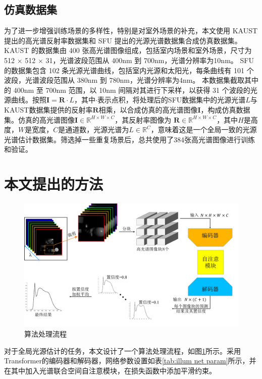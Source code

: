 \documentclass[
    type = master, %
    degree = academic,        %
    decl-page,  %
  ]{njuthesis}
\begin{document}
\subsection{仿真数据集}
为了进一步增强训练场景的多样性，特别是对室外场景的补充，本文使用 KAUST\cite{li2021multispectral} 提出的高光谱反射率数据集和 SFU\cite{barnard2002data} 提出的光源光谱数据集合成仿真数据集。 KAUST 的数据集由 400 张高光谱图像组成，包括室内场景和室外场景，尺寸为 512 $\times$ 512 $\times$ 31，光谱波段范围从 400nm 到 700nm，光谱分辨率为10nm。 SFU 的数据集包含 102 条光源光谱曲线，包括室内光源和太阳光，每条曲线有 101 个波段，光谱波段范围从 380nm 到 780nm，光谱分辨率为4nm。 本数据集截取其中的 400nm 至 700nm 范围，以 10nm 间隔对其进行下采样，以获得 31 个波段的光源曲线。按照$\mathbf{I} = \mathbf{R}\cdot L$，其中$\cdot$表示点积，将处理后的SFU数据集中的光源光谱$L$与 KAUST数据集提供的反射率$\mathbf{R}$相乘，以合成仿真的高光谱图像$\mathbf{I}$，构成仿真数据集。仿真的高光谱图像$\mathbf{I} \in \mathbb{R}^{H \times W \times C}$，其反射率图像为 $\mathbf{R} \in \mathbb{R}^{H \times W \times C}$，其中$H$是高度，$W$是宽度，$C$是通道数，光源光谱为$L \in \mathbb{R}^{C}$，意味着这是一个全局一致的光源光谱估计数据集。筛选掉一些重复场景后，总共使用了384张高光谱图像进行训练和验证。


\section{本文提出的方法}
\begin{figure}[h]
	\centering
	\includegraphics[width=1.0\linewidth]{docs/fig-chap2/fig-2-pipeline-u.pdf}
	\caption{算法处理流程\quad }
	\label{fig:pipeline}
\end{figure}
对于全局光源估计的任务，本文设计了一个算法处理流程，如图\ref{fig:pipeline}所示。采用Transformer的编码器和解码器，网络参数设置如表\ref{tab:illum net param}所示，并在其中加入光谱联合空间自注意模块，在损失函数中添加平滑约束。
\end{document}
